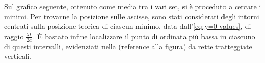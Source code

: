 \documentclass[../main.tex]{subfiles}
\begin{document}

Sul grafico seguente, ottenuto come media tra i vari set, si è proceduto a cercare i minimi. Per trovarne la posizione sulle ascisse, sono stati considerati degli intorni centrati sulla posizione teorica di ciascun minimo, data dall'\autoref{eq:y=0 values}, di raggio $\frac{\lambda L}{2 a}$. È bastato infine localizzare il punto di ordinata più bassa in ciascuno di questi intervalli, evidenziati nella (reference alla figura) da rette tratteggiate verticali.

\end{document}
